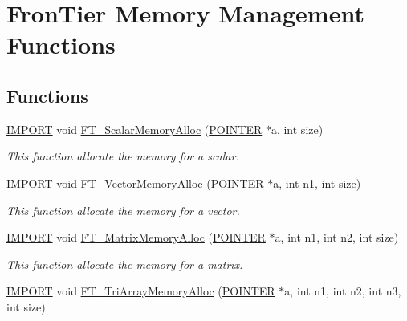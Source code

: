 \hypertarget{group___m_e_m_o_r_y}{}\section{Fron\+Tier Memory Management Functions}
\label{group___m_e_m_o_r_y}
\subsection*{Functions}
\begin{DoxyCompactItemize}
\item 
\hyperlink{cdecs_8h_a773175d74e73776d69c3e538f17de1ee}{I\+M\+P\+O\+RT} void \hyperlink{group___m_e_m_o_r_y_ga888f56a3301f51e6aac40f551baeb4be}{F\+T\+\_\+\+Scalar\+Memory\+Alloc} (\hyperlink{cdecs_8h_ae51a81000f343b8ec43bca1f6a723d7b}{P\+O\+I\+N\+T\+ER} $\ast$a, int size)
\begin{DoxyCompactList}\small\item\em This function allocate the memory for a scalar. \end{DoxyCompactList}\item 
\hyperlink{cdecs_8h_a773175d74e73776d69c3e538f17de1ee}{I\+M\+P\+O\+RT} void \hyperlink{group___m_e_m_o_r_y_ga570eae212fd06f81b13cba40afab4f13}{F\+T\+\_\+\+Vector\+Memory\+Alloc} (\hyperlink{cdecs_8h_ae51a81000f343b8ec43bca1f6a723d7b}{P\+O\+I\+N\+T\+ER} $\ast$a, int n1, int size)
\begin{DoxyCompactList}\small\item\em This function allocate the memory for a vector. \end{DoxyCompactList}\item 
\hyperlink{cdecs_8h_a773175d74e73776d69c3e538f17de1ee}{I\+M\+P\+O\+RT} void \hyperlink{group___m_e_m_o_r_y_gaf212e9156877eb00239c77ce67a1a605}{F\+T\+\_\+\+Matrix\+Memory\+Alloc} (\hyperlink{cdecs_8h_ae51a81000f343b8ec43bca1f6a723d7b}{P\+O\+I\+N\+T\+ER} $\ast$a, int n1, int n2, int size)
\begin{DoxyCompactList}\small\item\em This function allocate the memory for a matrix. \end{DoxyCompactList}\item 
\hyperlink{cdecs_8h_a773175d74e73776d69c3e538f17de1ee}{I\+M\+P\+O\+RT} void \hyperlink{group___m_e_m_o_r_y_gabe5793d460243dc938707cee6c3240ee}{F\+T\+\_\+\+Tri\+Array\+Memory\+Alloc} (\hyperlink{cdecs_8h_ae51a81000f343b8ec43bca1f6a723d7b}{P\+O\+I\+N\+T\+ER} $\ast$a, int n1, int n2, int n3, int size)

\end{DoxyCompactItemize}
